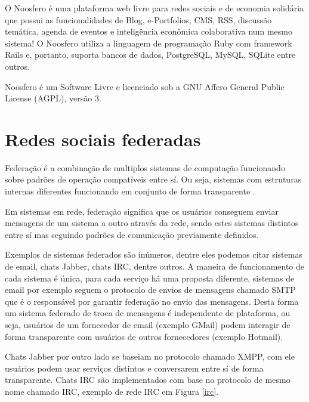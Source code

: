\documentclass[12pt]{article}
\begin{document}
O Noosfero\cite{noosfero} é uma plataforma web livre para redes sociais e de
economia solidária que possui as funcionalidades de Blog, e-Portfolios, CMS,
RSS, discussão temática, agenda de eventos e inteligência econômica
colaborativa num mesmo sistema! O Noosfero utiliza a linguagem de programação
Ruby com framework Rails e, portanto, suporta bancos de dados, PostgreSQL,
MySQL, SQLite entre outros.

Noosfero é um Software Livre e licenciado sob a GNU Affero General Public
License (AGPL), versão 3.

\section{Redes sociais federadas}

Federação é a combinação de multiplos sistemas de computação funcionando sobre
padrões de operação compatíveis entre sí. Ou seja, sistemas com estruturas
internas diferentes funcionando em conjunto de forma transparente
\cite{federacao}.

Em sistemas em rede, federação significa que os usuários conseguem enviar
mensagens de um sistema a outro através da rede, sendo estes sistemas
distintos entre sí mas seguindo padrões de comunicação previamente definidos.

Exemplos de sistemas federados são inúmeros, dentre eles podemos citar
sistemas de email, chats Jabber, chats IRC, dentre outros. A maneira de
funcionamento de cada sistema é única, para cada serviço há uma proposta
diferente, sistemas de email por exemplo seguem o protocolo de envios de
mensagens chamado SMTP\cite{smtp} que é o responsável por garantir federação
no envio das mensagens. Desta forma um sistema federado de troca de
mensagens é independente de plataforma, ou seja, usuários de um fornecedor de
email (exemplo GMail) podem interagir de forma transparente com usuários de
outros fornecedores (exemplo Hotmail).

Chats Jabber por outro lado se baseiam no protocolo chamado XMPP\cite{xmpp},
com ele usuários podem usar serviços distintos e conversarem entre sí de forma
transparente. Chats IRC são implementados com base no protocolo de mesmo nome
chamado IRC\cite{irc}, exemplo de rede IRC em Figura \ref{irc}.
\end{document}
